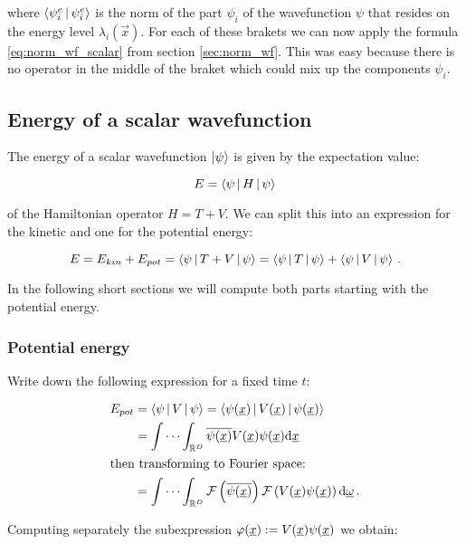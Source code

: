 where $\Braket{\psi^{e}_i|\psi^{e}_i}$ is the norm of the part $\psi_i$ of the
wavefunction $\psi$ that resides on the energy level $\lambda_i(\vec{x})$. For
each of these brakets we can now apply the formula \eqref{eq:norm_wf_scalar}
from section \ref{sec:norm_wf}. This was easy because there is no operator in
the middle of the braket which could mix up the components $\psi_i$.


\subsection{Energy of a scalar wavefunction}
\label{sec:energy_wf}


The energy of a scalar wavefunction $\Ket{\psi}$ is given by the expectation value:

\begin{equation}
  E = \Braket{\psi | H | \psi}
\end{equation}

of the Hamiltonian operator $H = T + V$. We can split this into an expression
for the kinetic and one for the potential energy:

\begin{equation}
  E = E_{kin} + E_{pot} = \Braket{\psi | T+V | \psi} = \Braket{\psi | T | \psi} + \Braket{\psi | V | \psi} \,.
\end{equation}

In the following short sections we will compute both parts starting with the
potential energy.


\subsubsection{Potential energy}


Write down the following expression for a fixed time $t$:

\begin{align*}
  E_{pot} & = \Braket{\psi | V | \psi} = \Braket{\psi(\underline{x}) | V(\underline{x}) | \psi(\underline{x})} \\
          & = \idotsint_{\mathbb{R}^D} \overline{\psi(\underline{x})} V(\underline{x}) \psi(\underline{x}) \mathrm{d}\underline{x} \\
\intertext{then transforming to Fourier space:}
          & = \idotsint_{\mathbb{R}^D} \mathcal{F}\left(\overline{\psi(\underline{x})}\right) \mathcal{F}\left(V(\underline{x}) \psi(\underline{x})\right) \mathrm{d}\underline{\omega} \,.
\end{align*}

Computing separately the subexpression $\varphi(\underline{x}) := V(\underline{x}) \psi(\underline{x})$
we obtain:

